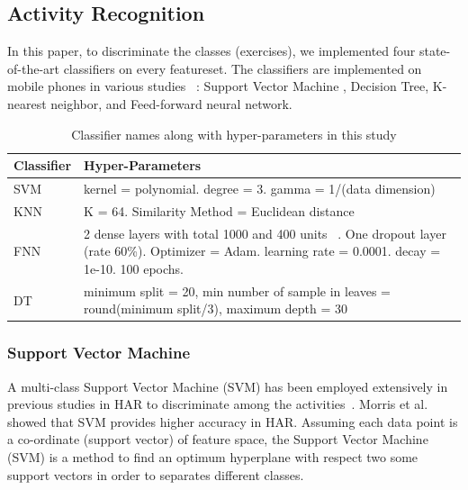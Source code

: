 \documentclass[journal,article,submit,moreauthors,pdftex]{Definitions/mdpi}
\begin{document}
\subsection{Activity Recognition}
In this paper, to discriminate the classes (exercises), we implemented four state-of-the-art classifiers on every featureset. The classifiers are implemented on mobile phones in various studies ~\cite{morris2014recofit,baldominos2019comparison,rosati2018comparison}: Support Vector Machine , Decision Tree, K-nearest neighbor, and Feed-forward neural network. 
\begin{table}[H]
	\caption{Classifier names along with hyper-parameters in this study}
	\centering
	\begin{tabular}{p{2cm}p{7.7cm}}
		\toprule
		\textbf{Classifier} & \textbf{Hyper-Parameters} \\
		\midrule
		SVM &  kernel = polynomial. degree = 3. gamma = 1/(data dimension)  \\
		\midrule
		KNN & K = 64. Similarity Method = Euclidean distance  \\
		\midrule
		FNN & { 2 dense layers with total 1000 and 400 units ~\cite{nair2010rectified}. One dropout layer (rate 60\%). Optimizer = Adam. learning rate = 0.0001. decay = 1e-10. 100 epochs.}\\
		\midrule
		DT & minimum split = 20, min number of sample in leaves = round(minimum split/3), maximum depth = 30 \\
		\bottomrule
	\end{tabular}
	\label{classifier_hyper_parameter}
\end{table}

\subsubsection{Support Vector Machine}
A multi-class Support Vector Machine (SVM) has been employed extensively in previous studies in HAR to discriminate among the activities~\cite{zhang2012physical,rosati2018comparison,morris2014recofit}. Morris et al.~\cite{morris2014recofit} showed that SVM provides higher accuracy in HAR. Assuming each data point is a co-ordinate (support vector) of feature space, the Support Vector Machine (SVM) is a method to find an optimum hyperplane with respect two some support vectors in order to separates different classes. 

\end{document}
